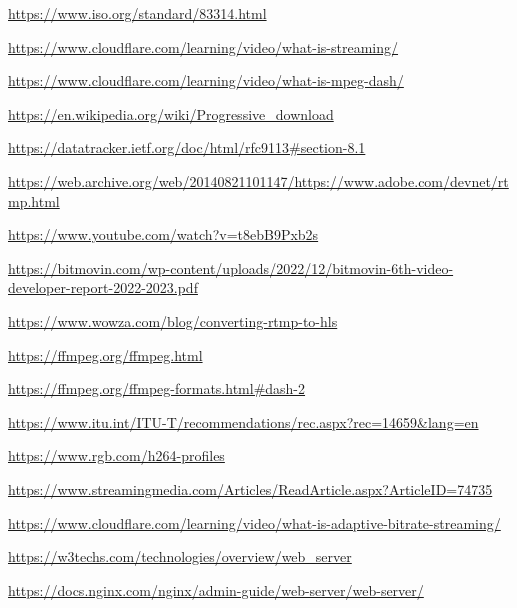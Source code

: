 \documentclass{article}
\begin{document}
\begin{thebibliography}{}

\item \url{https://www.iso.org/standard/83314.html}

\item \url{https://www.cloudflare.com/learning/video/what-is-streaming/}

\item \url{https://www.cloudflare.com/learning/video/what-is-mpeg-dash/}

\item \url{https://en.wikipedia.org/wiki/Progressive_download}

\item \url{https://datatracker.ietf.org/doc/html/rfc9113#section-8.1}

\item \url{https://web.archive.org/web/20140821101147/https://www.adobe.com/devnet/rtmp.html}

\item \url{https://www.youtube.com/watch?v=t8ebB9Pxb2s}

\item \url{https://bitmovin.com/wp-content/uploads/2022/12/bitmovin-6th-video-developer-report-2022-2023.pdf}

\item \url{https://www.wowza.com/blog/converting-rtmp-to-hls}

\item \url{https://ffmpeg.org/ffmpeg.html}

\item \url{https://ffmpeg.org/ffmpeg-formats.html#dash-2}

\item \url{https://www.itu.int/ITU-T/recommendations/rec.aspx?rec=14659&lang=en}

\item \url{https://www.rgb.com/h264-profiles}

\item \url{https://www.streamingmedia.com/Articles/ReadArticle.aspx?ArticleID=74735}

\item \url{https://www.cloudflare.com/learning/video/what-is-adaptive-bitrate-streaming/}

\item \url{https://w3techs.com/technologies/overview/web_server}

\item \url{https://docs.nginx.com/nginx/admin-guide/web-server/web-server/}


\end{thebibliography}
\end{document}
